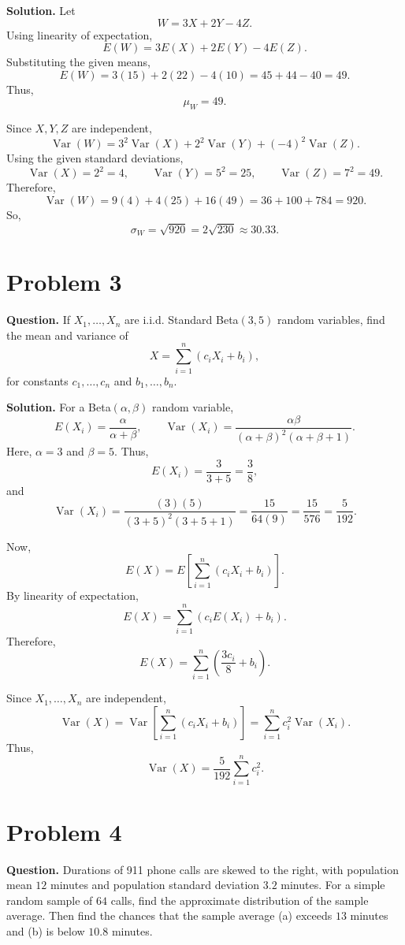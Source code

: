 \documentclass[11pt]{article}
\begin{document}
\textbf{Solution.} Let
\[
W=3X+2Y-4Z.
\]
Using linearity of expectation,
\[
E(W)=3E(X)+2E(Y)-4E(Z).
\]
Substituting the given means,
\[
E(W)=3(15)+2(22)-4(10)=45+44-40=49.
\]
Thus,
\[
\boxed{\mu_W=49}.
\]

Since $X,Y,Z$ are independent,
\[
\operatorname{Var}(W)=3^2\operatorname{Var}(X)+2^2\operatorname{Var}(Y)+(-4)^2\operatorname{Var}(Z).
\]
Using the given standard deviations,
\[
\operatorname{Var}(X)=2^2=4, \qquad \operatorname{Var}(Y)=5^2=25, \qquad \operatorname{Var}(Z)=7^2=49.
\]
Therefore,
\[
\operatorname{Var}(W)=9(4)+4(25)+16(49)=36+100+784=920.
\]
So,
\[
\boxed{\sigma_W=\sqrt{920}=2\sqrt{230}\approx 30.33}.
\]

\newpage
\section*{Problem 3}

\textbf{Question.} If $X_1,\ldots,X_n$ are i.i.d. Standard Beta$(3,5)$ random variables, find the mean and variance of
\[
X=\sum_{i=1}^n(c_iX_i+b_i),
\]
for constants $c_1,\ldots,c_n$ and $b_1,\ldots,b_n$.

\textbf{Solution.} For a Beta$(\alpha,\beta)$ random variable,
\[
E(X_i)=\frac{\alpha}{\alpha+\beta},
\qquad
\operatorname{Var}(X_i)=\frac{\alpha\beta}{(\alpha+\beta)^2(\alpha+\beta+1)}.
\]
Here, $\alpha=3$ and $\beta=5$. Thus,
\[
E(X_i)=\frac{3}{3+5}=\frac{3}{8},
\]
and
\[
\operatorname{Var}(X_i)=\frac{(3)(5)}{(3+5)^2(3+5+1)}=\frac{15}{64(9)}=\frac{15}{576}=\frac{5}{192}.
\]

Now,
\[
E(X)=E\left[\sum_{i=1}^{n}(c_iX_i+b_i)\right].
\]
By linearity of expectation,
\[
E(X)=\sum_{i=1}^{n}\left(c_iE(X_i)+b_i\right).
\]
Therefore,
\[
\boxed{E(X)=\sum_{i=1}^{n}\left(\frac{3c_i}{8}+b_i\right)}.
\]

Since $X_1,\ldots,X_n$ are independent,
\[
\operatorname{Var}(X)=\operatorname{Var}\left[\sum_{i=1}^{n}(c_iX_i+b_i)\right]=\sum_{i=1}^{n}c_i^2\operatorname{Var}(X_i).
\]
Thus,
\[
\boxed{\operatorname{Var}(X)=\frac{5}{192}\sum_{i=1}^{n}c_i^2}.
\]

\newpage
\section*{Problem 4}

\textbf{Question.} Durations of 911 phone calls are skewed to the right, with population mean $12$ minutes and population standard deviation $3.2$ minutes. For a simple random sample of $64$ calls, find the approximate distribution of the sample average. Then find the chances that the sample average (a) exceeds $13$ minutes and (b) is below $10.8$ minutes.
\end{document}

